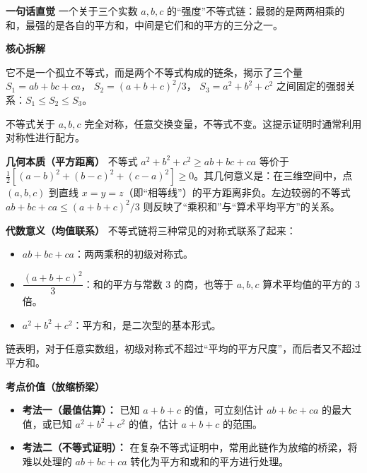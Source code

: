 \begin{explanationbox}
\textbf{\textcolor{CExplanation}{一句话直觉}}
一个关于三个实数 $a, b, c$ 的“强度”不等式链：最弱的是两两相乘的和，最强的是各自的平方和，中间是它们和的平方的三分之一。

\medskip
\textbf{\textcolor{CExplanation}{核心拆解}}
\begin{description}[style=nextline, leftmargin=2.8em, labelsep=0.5em, itemsep=0.45em]
    \item[\textbf{要点一（链式结构）：}] 它不是一个孤立不等式，而是两个不等式构成的链条，揭示了三个量 $S_1 = ab+bc+ca$， $S_2 = (a+b+c)^2/3$， $S_3 = a^2+b^2+c^2$ 之间固定的强弱关系：$S_1 \le S_2 \le S_3$。
    \item[\textbf{要点二（对称性）：}] 不等式关于 $a, b, c$ 完全对称，任意交换变量，不等式不变。这提示证明时通常利用对称性进行配方。
\end{description}

\medskip
\textbf{\textcolor{CExplanation}{几何本质（平方距离）}}
不等式 $a^2+b^2+c^2 \ge ab+bc+ca$ 等价于 $\frac12[(a-b)^2+(b-c)^2+(c-a)^2] \ge 0$。其几何意义是：在三维空间中，点 $(a,b,c)$ 到直线 $x=y=z$（即“相等线”）的平方距离非负。左边较弱的不等式 $ab+bc+ca \le (a+b+c)^2/3$ 则反映了“乘积和”与“算术平均平方”的关系。

\medskip
\textbf{\textcolor{CExplanation}{代数意义（均值联系）}}
不等式链将三种常见的对称式联系了起来：
\begin{itemize}[leftmargin=*, itemsep=0.3em, topsep=0.2em]
    \item $ab+bc+ca$：两两乘积的初级对称式。
    \item $\dfrac{(a+b+c)^2}{3}$：和的平方与常数 $3$ 的商，也等于 $a,b,c$ 算术平均值的平方的 $3$ 倍。
    \item $a^2+b^2+c^2$：平方和，是二次型的基本形式。
\end{itemize}
链表明，对于任意实数组，初级对称式不超过“平均的平方尺度”，而后者又不超过平方和。

\medskip
\textbf{\textcolor{CExplanation}{考点价值（放缩桥梁）}}
\begin{itemize}[leftmargin=*, itemsep=0.5em, topsep=0.4em]
    \item \textbf{考法一（最值估算）：} 已知 $a+b+c$ 的值，可立刻估计 $ab+bc+ca$ 的最大值，或已知 $a^2+b^2+c^2$ 的值，估计 $a+b+c$ 的范围。
    \item \textbf{考法二（不等式证明）：} 在复杂不等式证明中，常用此链作为放缩的桥梁，将难以处理的 $ab+bc+ca$ 转化为平方和或和的平方进行处理。
\end{itemize}


\end{explanationbox}
